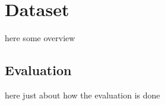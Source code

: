 \documentclass[a4paper,10pt]{article}
\title{}
\author{Jose Rodriguez}
\begin{document}
\maketitle

\begin{abstract}

\end{abstract}

\section{Dataset}
here some overview
\subsection{Evaluation}
here just about how the evaluation is done
\end{document}
